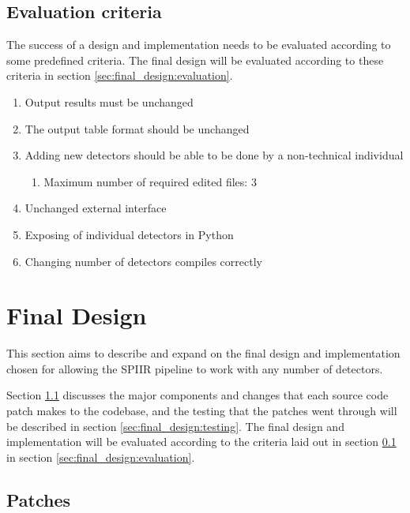 \documentclass{article}
\begin{document}
\subsection{Evaluation criteria} \label{sec:design_process:criteria}

The success of a design and implementation needs to be evaluated according to some predefined criteria.
The final design will be evaluated according to these criteria in section \ref{sec:final_design:evaluation}.

\begin{enumerate}
    \item Output results must be unchanged
    \item The output table format should be unchanged
    \item Adding new detectors should be able to be done by a non-technical individual
        \begin{enumerate}
            \item Maximum number of required edited files: 3
        \end{enumerate}
    \item Unchanged external interface
    \item Exposing of individual detectors in Python
    \item Changing number of detectors compiles correctly
\end{enumerate}

\section{Final Design} \label{sec:final_design}

This section aims to describe and expand on the final design and implementation chosen for allowing the SPIIR pipeline to work with any number of detectors.

Section \ref{sec:final_design:patches} discusses the major components and changes that each source code patch makes to the codebase, and the testing that the patches went through will be described in section \ref{sec:final_design:testing}.
The final design and implementation will be evaluated according to the criteria laid out in section \ref{sec:design_process:criteria} in section \ref{sec:final_design:evaluation}.

\subsection{Patches} \label{sec:final_design:patches}
\end{document}
